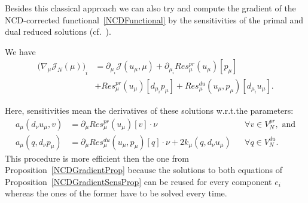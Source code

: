 Besides this classical approach we can also try and compute the gradient of the NCD-corrected functional~\eqref{NCDFunctional} by the sensitivities of the primal and dual reduced solutions (cf.~\cite[Proposition 3.9]{Keil2021}).
\begin{proposition}\label{NCDGradientSensProp}
    We have
    \begin{align*}\label{NCDGradientSens}
        {\big( \nabla_\mu \mathcal{J}_N(\mu) \big)}_i &= \partial_{\mu_i} \mathcal{J}(u_\mu, \mu) + \partial_{\mu_i} Res_\mu^{pr}(u_\mu)[p_\mu] \\
        &+ Res_\mu^{pr}(u_\mu)[d_{\mu_i} p_\mu] + Res_\mu^{du}(u_\mu, p_\mu)[d_{\mu_i} u_\mu].
    \end{align*}
\end{proposition}
Here, sensitivities mean the derivatives of these solutions w.r.t.\@ the parameters:
\begin{align*}
    a_\mu(d_\nu u_\mu, v) &= \partial_\mu Res_\mu^{pr}(u_\mu)[v] \cdot \nu &&\forall v \in V_N^{pr}, \text{ and} \\
    a_\mu(q, d_\nu p_\mu) &= \partial_\mu Res_\mu^{du}(u_\mu, p_\mu)[q] \cdot \nu + 2 k_\mu(q, d_\nu u_\mu) &&\forall q \in V_N^{du}.
\end{align*}
This procedure is more efficient then the one from Proposition~\ref{NCDGradientProp} because the solutions to both equations of Proposition~\ref{NCDGradientSensProp} can be reused for every component $e_i$ whereas the ones of the former have to be solved every time.

